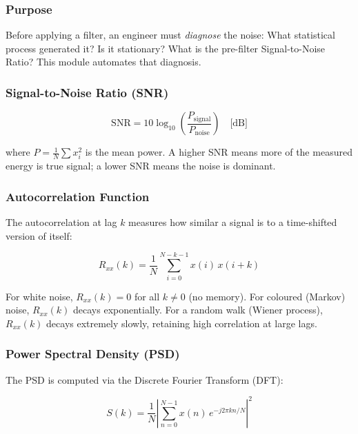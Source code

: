 \documentclass[12pt, a4paper]{article}
\begin{document}
\subsubsection{Purpose}

Before applying a filter, an engineer must \emph{diagnose} the noise: What statistical
process generated it? Is it stationary? What is the pre-filter Signal-to-Noise Ratio?
This module automates that diagnosis.

\subsubsection{Signal-to-Noise Ratio (SNR)}

\begin{equation}
  \text{SNR} = 10\log_{10}\!\left(\frac{P_\text{signal}}{P_\text{noise}}\right) \quad \text{[dB]}
  \label{eq:snr}
\end{equation}

where $P = \frac{1}{N}\sum x_i^2$ is the mean power. A higher SNR means more of the
measured energy is true signal; a lower SNR means the noise is dominant.

\subsubsection{Autocorrelation Function}

The autocorrelation at lag $k$ measures how similar a signal is to a time-shifted
version of itself:

\begin{equation}
  R_{xx}(k) = \frac{1}{N}\sum_{i=0}^{N-k-1} x(i)\, x(i+k)
  \label{eq:autocorr}
\end{equation}

For white noise, $R_{xx}(k) = 0$ for all $k \neq 0$ (no memory). For coloured
(Markov) noise, $R_{xx}(k)$ decays exponentially. For a random walk (Wiener process),
$R_{xx}(k)$ decays extremely slowly, retaining high correlation at large lags.

\subsubsection{Power Spectral Density (PSD)}

The PSD is computed via the Discrete Fourier Transform (DFT):

\begin{equation}
  S(k) = \frac{1}{N}\left|\sum_{n=0}^{N-1} x(n)\, e^{-j2\pi kn/N}\right|^2
  \label{eq:psd}
\end{equation}
\end{document}

